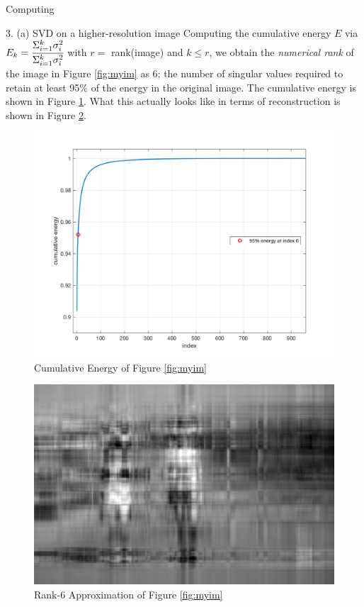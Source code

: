 \begin{section}{Computing}
\begin{homeworkSection}{3. (a) SVD on a higher-resolution image}
Computing the cumulative energy $E$ via $E_k = \cfrac{\Sigma_{i=1}^{k} \sigma_i^2}{\Sigma_{i=1}^{k} \sigma_i^2}$ with $r=$ rank(image) and $k \leq r$, we obtain the \textit{numerical rank} of the image in Figure \ref{fig:myim} as 6; the number of singular values required to retain at least 95\% of the energy in the original image. The cumulative energy is shown in Figure \ref{fig:energy}. What this actually looks like in terms of reconstruction is shown in Figure \ref{fig:rank_6}.

\begin{figure}[H]
\centering
\includegraphics[width=0.75\columnwidth]{../data/cumulative_energy}
\caption{Cumulative Energy of Figure \ref{fig:myim}}
\label{fig:energy}
\end{figure}

\begin{figure}[H]
\centering
\includegraphics[width=0.90\columnwidth]{../data/rank_6_approx}
\caption{Rank-6 Approximation of Figure \ref{fig:myim}}
\label{fig:rank_6}
\end{figure}


\end{homeworkSection}
\end{section}
